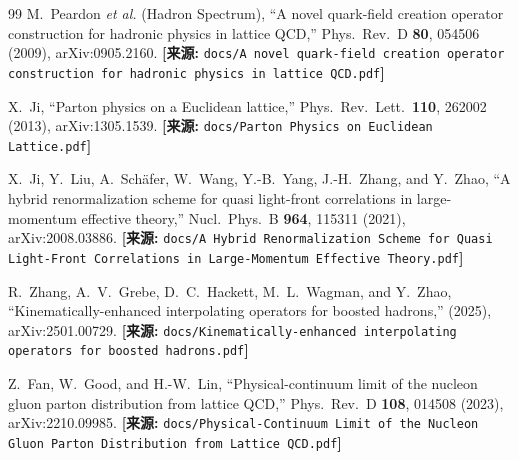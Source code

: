 \documentclass[12pt,a4paper]{ctexart}
\theoremstyle{definition}
\begin{document}
\begin{thebibliography}{99}
M.~Peardon \textit{et al.} (Hadron Spectrum),
``A novel quark-field creation operator construction for hadronic physics in lattice QCD,''
Phys.\ Rev.\ D \textbf{80}, 054506 (2009), arXiv:0905.2160.
\quad\textbf{[来源:} \texttt{docs/A novel quark-field creation operator construction for hadronic physics in lattice QCD.pdf}\textbf{]}


X.~Ji,
``Parton physics on a Euclidean lattice,''
Phys.\ Rev.\ Lett.\ \textbf{110}, 262002 (2013), arXiv:1305.1539.
\quad\textbf{[来源:} \texttt{docs/Parton Physics on Euclidean Lattice.pdf}\textbf{]}

X.~Ji, Y.~Liu, A.~Sch\"afer, W.~Wang, Y.-B.~Yang, J.-H.~Zhang, and Y.~Zhao,
``A hybrid renormalization scheme for quasi light-front correlations in large-momentum effective theory,''
Nucl.\ Phys.\ B \textbf{964}, 115311 (2021), arXiv:2008.03886.
\quad\textbf{[来源:} \texttt{docs/A Hybrid Renormalization Scheme for Quasi Light-Front Correlations in Large-Momentum Effective Theory.pdf}\textbf{]}


R.~Zhang, A.~V.~Grebe, D.~C.~Hackett, M.~L.~Wagman, and Y.~Zhao,
``Kinematically-enhanced interpolating operators for boosted hadrons,''
(2025), arXiv:2501.00729.
\quad\textbf{[来源:} \texttt{docs/Kinematically-enhanced interpolating operators for boosted hadrons.pdf}\textbf{]}

Z.~Fan, W.~Good, and H.-W.~Lin,
``Physical-continuum limit of the nucleon gluon parton distribution from lattice QCD,''
Phys.\ Rev.\ D \textbf{108}, 014508 (2023), arXiv:2210.09985.
\quad\textbf{[来源:} \texttt{docs/Physical-Continuum Limit of the Nucleon Gluon Parton Distribution from Lattice QCD.pdf}\textbf{]}

\end{thebibliography}
\end{document}
